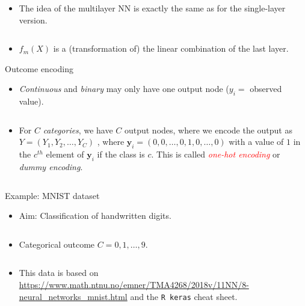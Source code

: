 \documentclass[
  10pt,
  ignorenonframetext,
]{beamer}
\providecommand{\tightlist}{%
  \setlength{\itemsep}{0pt}\setlength{\parskip}{0pt}}
\begin{document}
\begin{frame}
\begin{itemize}
\tightlist
\item
  The idea of the multilayer NN is exactly the same as for the
  single-layer version.
\end{itemize}

\(~\)

\begin{itemize}
\tightlist
\item
  \(f_m(X)\) is a (transformation of) the linear combination of the last
  layer.
\end{itemize}
\end{frame}

\begin{frame}
\begin{block}{Outcome encoding}
\protect\hypertarget{outcome-encoding}{}
\(~\)

\begin{itemize}
\tightlist
\item
  \emph{Continuous} and \emph{binary} may only have one output node
  (\(y_i=\) observed value).
\end{itemize}

\(~\)

\begin{itemize}
\tightlist
\item
  For \(C\) \emph{categories}, we have \(C\) output nodes, where we
  encode the output as \(Y = (Y_1, Y_2, \ldots, Y_C)\) , where
  \({\boldsymbol y}_i=(0,0,\ldots,0,1,0,\ldots,0)\) with a value of
  \(1\) in the \(c^{th}\) element of \({\boldsymbol y}_i\) if the class
  is \(c\). This is called \emph{\textcolor{red}{one-hot encoding}} or
  \emph{dummy encoding}.
\end{itemize}

\(~\)
\end{block}
\end{frame}

\begin{frame}[fragile]
\begin{block}{Example: MNIST dataset}
\protect\hypertarget{example-mnist-dataset}{}
\(~\)

\begin{itemize}
\tightlist
\item
  Aim: Classification of handwritten digits.
\end{itemize}

\(~\)

\begin{itemize}
\tightlist
\item
  Categorical outcome \(C=0,1,\ldots,9\).
\end{itemize}

\(~\)

\begin{itemize}
\tightlist
\item
  This data is based on
  \url{https://www.math.ntnu.no/emner/TMA4268/2018v/11NN/8-neural_networks_mnist.html}
  and the \texttt{R\ keras} cheat sheet.
\end{itemize}
\end{block}
\end{frame}
\end{document}
